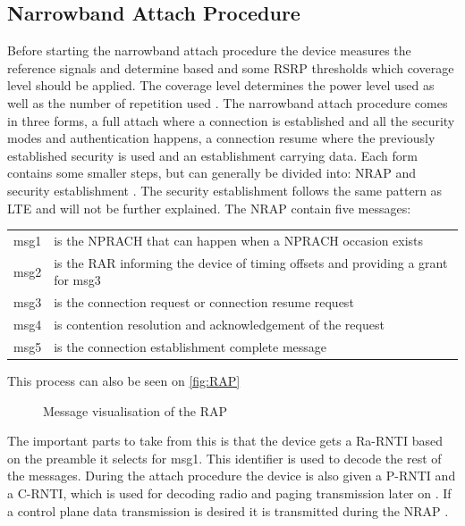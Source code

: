 \subsection{Narrowband Attach Procedure} \label{sec:RAP}
Before starting the narrowband attach procedure the device measures the reference signals and determine based and some \gls{RSRP} thresholds which coverage level should be applied. The coverage level determines the power level used as well as the number of repetition used \citep{NB-IoT_Book}. The narrowband attach procedure comes in three forms, a full attach where a connection is established and all the security modes and authentication happens, a connection resume where the previously established security is used and an establishment carrying data. Each form contains some smaller steps, but can generally be divided into: \gls{NRAP} and security establishment \citep{REL-13}. The security establishment follows the same pattern as LTE and will not be further explained. The \gls{NRAP} contain five messages:
\begin{tabular}{ll}
msg1 & is the NPRACH that can happen when a NPRACH occasion exists \\
msg2 & is the \gls{RAR} informing the device of timing offsets and providing a grant for msg3 \\
msg3 & is the connection request or connection resume request \\
msg4 & is contention resolution and acknowledgement of the request \\
msg5 & is the connection establishment complete message\\
\end{tabular}

This process can also be seen on \autoref{fig:RAP}


\begin{figure}[H]
\centering

\caption{Message visualisation of the \gls{RAP}}
\label{fig:RAP}
\end{figure}

The important parts to take from this is that the device gets a \gls{Ra-RNTI} based on the preamble it selects for msg1. This identifier is used to decode the rest of the messages. During the attach procedure the device is also given a \gls{P-RNTI} and a \gls{C-RNTI}, which is used for decoding radio and paging transmission later on \citep{whitepaper}. If a control plane data transmission is desired it is transmitted during the \gls{NRAP} \citep{primer}.


